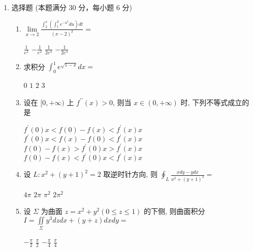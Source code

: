 \begin{enumerate}
\begin{enumerate}
	
		
	\end{enumerate}
	
\item 
选择题 (本题满分 30 分，每小题 6 分)
\begin{enumerate}
	\item
	$ \lim\limits _{x \rightarrow 2} \frac{\int_{2}^{x}\left(\int_{t}^{2} e^{-u^{2}} du \right) d t}{(x-2)^{2}}=$  
	
	
\fourchoices
{$\frac{1}{e^{2}}$}
{$-\frac{1}{e^{2}}$}
{$\frac{1}{2 e^{4}}$}
{$-\frac{1}{2 e^{4}}$}

	
	
	\item
	求积分 $\int_{0}^{1} e^{\sqrt{1-x}} d x=$  
	
	
\fourchoices
{$ 0 $}
{$ 1 $}
{$ 2 $}
{$ 3 $}


\item
设在 $[0,+\infty)$ 上 $f^{\prime \prime}(x)>0$, 则当 $x \in(0,+\infty)$ 时, 下列不等式成立的是  


\fourchoices
{$f^{\prime}(0) x<f(0)-f(x)<f^{\prime}(x) x$}
{$f^{\prime}(0) x<f(x)-f(0)<f^{\prime}(x)x$}
{$f(0)-f(x)>f^{\prime}(0) x>f^{\prime}(x)x$}
{$f(0)-f(x)<f^{\prime}(0) x<f^{\prime}(x)x$}




\item
设 $L: x^{2}+(y+1)^{2}=2$ 取逆时针方向, 则 $\oint_{L} \frac{x d y-y d x}{x^{2}+(y+1)^{2}}=$  


\fourchoices
{$4 \pi$}
{$2 \pi$}
{$\pi^{2}$}
{$2 \pi^{2}$}



\item
设 $\Sigma$ 为曲面 $z=x^{2}+y^{2}(0 \leqslant z \leqslant 1)$ 的下侧, 则曲面积分 $I=\iint\limits_{\Sigma} y^{3} d z d x+(y+z) d x d y=$  


\fourchoices
{$-\frac{\pi}{2}$}
{$\frac{\pi}{2}$}
{$-\frac{\pi}{4}$}
{$\frac{\pi}{4}$}


\end{enumerate}



\end{enumerate}
